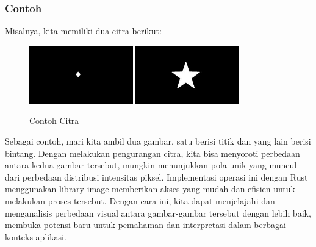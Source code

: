 \documentclass[a4paper,12pt,openany]{book}
\begin{document}
\subsubsection{Contoh}
Misalnya, kita memiliki dua citra berikut:
\begin{figure}[H]
    \centering
    \includegraphics[width=0.4\textwidth]{./image/arithmetic/dot.jpg}
    \includegraphics[width=0.4\textwidth]{./image/arithmetic/star-1.jpg}
    \caption{Contoh Citra}
\end{figure}

Sebagai contoh, mari kita ambil dua gambar, satu berisi titik dan yang lain berisi bintang. Dengan melakukan pengurangan citra, kita bisa menyoroti perbedaan antara kedua gambar tersebut, mungkin menunjukkan pola unik yang muncul dari perbedaan distribusi intensitas piksel. Implementasi operasi ini dengan Rust menggunakan library image memberikan akses yang mudah dan efisien untuk melakukan proses tersebut. Dengan cara ini, kita dapat menjelajahi dan menganalisis perbedaan visual antara gambar-gambar tersebut dengan lebih baik, membuka potensi baru untuk pemahaman dan interpretasi dalam berbagai konteks aplikasi.
\end{document}
